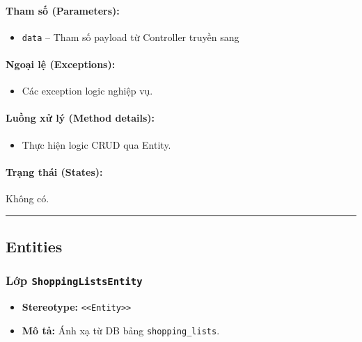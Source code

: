 \documentclass[12pt,a4paper]{article}
\begin{document}
\paragraph{Tham số (Parameters):}
\begin{itemize}[leftmargin=*]
    \item \texttt{data} – Tham số payload từ Controller truyền sang
\end{itemize}


\paragraph{Ngoại lệ (Exceptions):}
\begin{itemize}[leftmargin=*]
    \item Các exception logic nghiệp vụ.
\end{itemize}


\paragraph{Luồng xử lý (Method details):}
\begin{itemize}[leftmargin=*]
    \item Thực hiện logic CRUD qua Entity.
\end{itemize}


\paragraph{Trạng thái (States):}
Không có.

\vskip 0.5cm
\noindent\rule{\textwidth}{0.5pt}
\vskip 0.5cm

\subsection{Entities}

\subsubsection{Lớp \texttt{ShoppingListsEntity}}
\begin{itemize}[leftmargin=*]
    \item \textbf{Stereotype:} \texttt{\textless{}\textless{}Entity\textgreater{}\textgreater{}}
    \item \textbf{Mô tả:} Ánh xạ từ DB bảng \texttt{shopping\_lists}.
\end{itemize}
\end{document}
